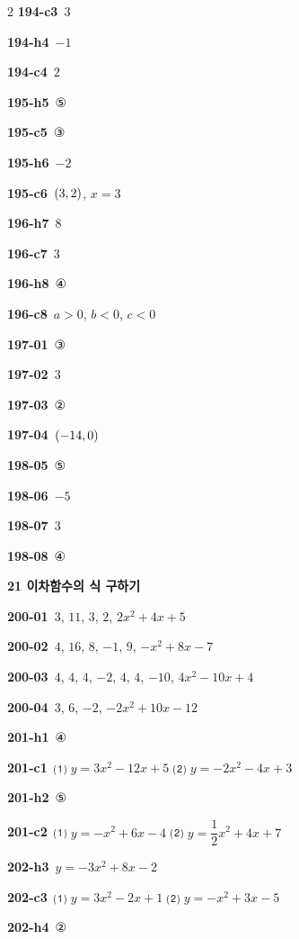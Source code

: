 \documentclass[10pt,a4paper]{article}
\begin{document}
\begin{multicols}{2}
\noindent\textbf{194-c3}\ $3$\par
\noindent\textbf{194-h4}\ $-1$\par
\noindent\textbf{194-c4}\ $2$\par
\noindent\textbf{195-h5}\ ⑤\par
\noindent\textbf{195-c5}\ ③\par
\noindent\textbf{195-h6}\ $-2$\par
\noindent\textbf{195-c6}\ $(3{,}\mkern3mu\mathopen{}2)$, $x=3$\par
\noindent\textbf{196-h7}\ $8$\par
\noindent\textbf{196-c7}\ $3$\par
\noindent\textbf{196-h8}\ ④\par
\noindent\textbf{196-c8}\ $a>0$, $b<0$, $c<0$\par
\noindent\textbf{197-01}\ ③\par
\noindent\textbf{197-02}\ $3$\par
\noindent\textbf{197-03}\ ②\par
\noindent\textbf{197-04}\ $(-14{,}\mkern3mu\mathopen{}0)$\par
\noindent\textbf{198-05}\ ⑤\par
\noindent\textbf{198-06}\ $-5$\par
\noindent\textbf{198-07}\ $3$\par
\noindent\textbf{198-08}\ ④\par
\noindent\textbf{21 이차함수의 식 구하기}\par\smallskip
\noindent\textbf{200-01}\ $3$, $11$, $3$, $2$, $2x^2+4x+5$\par
\noindent\textbf{200-02}\ $4$, $16$, $8$, $-1$, $9$, $-x^2+8x-7$\par
\noindent\textbf{200-03}\ $4$, $4$, $4$, $-2$, $4$, $4$, $-10$, $4x^2-10x+4$\par
\noindent\textbf{200-04}\ $3$, $6$, $-2$, $-2x^2+10x-12$\par
\noindent\textbf{201-h1}\ ④\par
\noindent\textbf{201-c1}\ ⑴ $y=3x^2-12x+5$ ⑵ $y=-2x^2-4x+3$\par
\noindent\textbf{201-h2}\ ⑤\par
\noindent\textbf{201-c2}\ ⑴ $y=-x^2+6x-4$ ⑵ $y=\dfrac{1}{2}x^2+4x+7$\par
\noindent\textbf{202-h3}\ $y=-3x^2+8x-2$\par
\noindent\textbf{202-c3}\ ⑴ $y=3x^2-2x+1$ ⑵ $y=-x^2+3x-5$\par
\noindent\textbf{202-h4}\ ②\par

\end{multicols}
\end{document}
